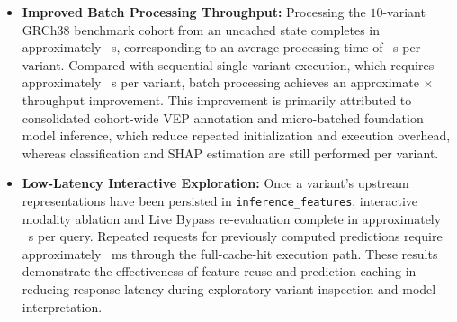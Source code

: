 \begin{itemize}
    \item \textbf{Improved Batch Processing Throughput:} Processing the $10$-variant GRCh38 benchmark cohort from an uncached state completes in approximately \tbd{}~s, corresponding to an average processing time of \tbd{}~s per variant. Compared with sequential single-variant execution, which requires approximately \tbd{}~s per variant, batch processing achieves an approximate \tbd{}$\times$ throughput improvement. This improvement is primarily attributed to consolidated cohort-wide VEP annotation and micro-batched foundation model inference, which reduce repeated initialization and execution overhead, whereas classification and SHAP estimation are still performed per variant.

    \item \textbf{Low-Latency Interactive Exploration:} Once a variant's upstream representations have been persisted in \texttt{inference\_features}, interactive modality ablation and Live Bypass re-evaluation complete in approximately \tbd{}~s per query. Repeated requests for previously computed predictions require approximately \tbd{}~ms through the full-cache-hit execution path. These results demonstrate the effectiveness of feature reuse and prediction caching in reducing response latency during exploratory variant inspection and model interpretation.
\end{itemize}
